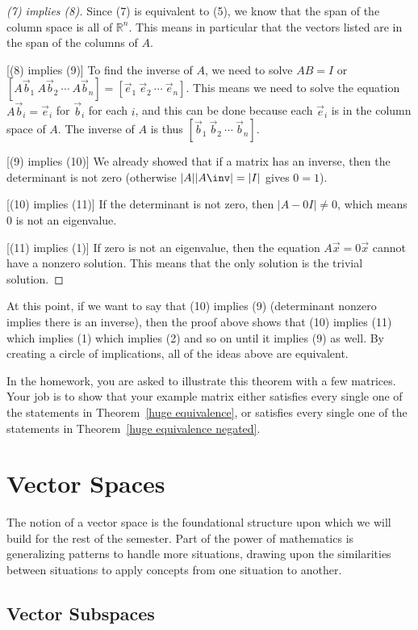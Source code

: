 \begin{proof}
[(7) implies (8)] Since (7) is equivalent to (5), we know that the span of the column space is all of ${\mathbb{R}}^n$. This means in particular that the vectors listed are in the span of the columns of $A$.

[(8) implies (9)]  To find the inverse of $A$, we need to solve $A B = I$ or $[A\vec b_1\ A\vec b_2\ \cdots\ A\vec b_n]=[\vec e_1\ \vec e_2\ \cdots\ \vec e_n]$. This means we need to solve the equation $A\vec b_i=\vec e_i$ for $\vec b_i$ for each $i$, and this can be done because each $\vec e_i$ is in the column space of $A$. The inverse of $A$ is thus $[\vec b_1 \ \vec b_2\ \cdots\ \vec b_n]$.

[(9) implies (10)] We already showed that if a matrix has an inverse, then the determinant is not zero (otherwise $|A||A\inv|=|I|$ gives $0=1$).

[(10) implies (11)] If the determinant is not zero, then $|A-0 I|\neq 0$, which means $0$ is not an eigenvalue.

[(11) implies (1)] If zero is not an eigenvalue, then the equation $A\vec x = 0\vec x$ cannot have a nonzero solution. This means that the only solution is the trivial solution.  
\end{proof}

At this point, if we want to say that (10) implies (9) (determinant nonzero implies there is an inverse), then the proof above shows that (10) implies (11) which implies (1) which implies (2) and so on until it implies (9) as well.  By creating a circle of implications, all of the ideas above are equivalent.


In the homework, you are asked to illustrate this theorem with a few matrices.  Your job is to show that your example matrix either satisfies every single one of the statements in Theorem~\ref{huge equivalence}, or satisfies every single one of the statements in Theorem~\ref{huge equivalence negated}.


\section{Vector Spaces}

The notion of a vector space is the foundational structure upon which we will build for the rest of the semester.  Part of the power of mathematics is generalizing patterns to handle more situations, drawing upon the similarities between situations to apply concepts from one situation to another.

\subsection{Vector Subspaces}

